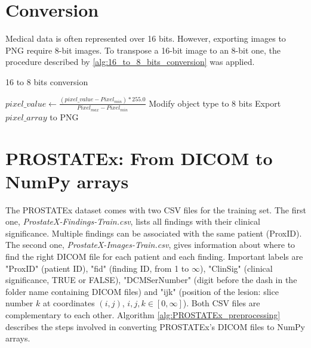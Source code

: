\section{Conversion}

Medical data is often represented over 16 bits. However, exporting images to PNG require 8-bit images. To transpose a 16-bit image to an 8-bit one, the procedure described by \ref{alg:16_to_8_bits_conversion} was applied.

\begin{algorithm}
    \caption{16 to 8 bits conversion}
    \label{alg:16_to_8_bits_conversion}
    \begin{algorithmic}[1] %
        			\State $pixel\_value \gets \frac{(pixel\_value - Pixel_{min}) * 255.0}{Pixel_{max} - Pixel_{min}}$
        		\EndFor
        		\State Modify object type to 8 bits
        		\State Export $pixel\_array$ to PNG
        \EndProcedure
    \end{algorithmic}
\end{algorithm}


\section{PROSTATEx: From DICOM to NumPy arrays}

The PROSTATEx dataset comes with two CSV files for the training set. The first one, \textit{ProstateX-Findings-Train.csv}, lists all findings with their clinical significance. Multiple findings can be associated with the same patient (ProxID). The second one, \textit{ProstateX-Images-Train.csv}, gives information about where to find the right DICOM file for each patient and each finding. Important labels are "ProxID" (patient ID), "fid" (finding ID, from 1 to $\infty$), "ClinSig" (clinical significance, TRUE or FALSE), "DCMSerNumber" (digit before the dash in the folder name containing DICOM files) and "ijk" (position of the lesion: slice number $k$ at coordinates $(i,j)$, $i,j,k \in [0,\infty]$). Both CSV files are complementary to each other. Algorithm \ref{alg:PROSTATEx_preprocessing} describes the steps involved in converting PROSTATEx's DICOM files to NumPy arrays. 


